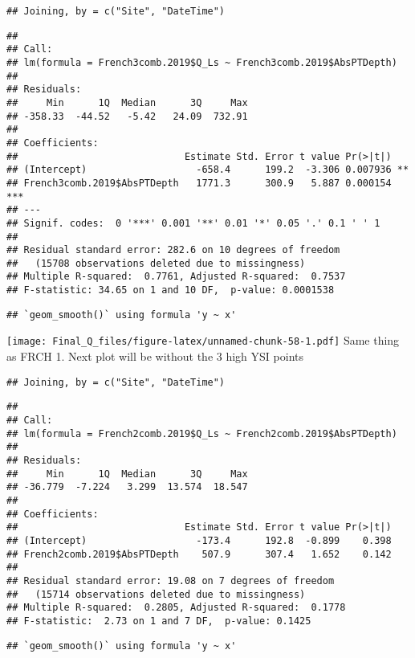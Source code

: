 \documentclass[
]{article}
\begin{document}
\begin{verbatim}
## Joining, by = c("Site", "DateTime")
\end{verbatim}

\begin{verbatim}
## 
## Call:
## lm(formula = French3comb.2019$Q_Ls ~ French3comb.2019$AbsPTDepth)
## 
## Residuals:
##     Min      1Q  Median      3Q     Max 
## -358.33  -44.52   -5.42   24.09  732.91 
## 
## Coefficients:
##                             Estimate Std. Error t value Pr(>|t|)    
## (Intercept)                   -658.4      199.2  -3.306 0.007936 ** 
## French3comb.2019$AbsPTDepth   1771.3      300.9   5.887 0.000154 ***
## ---
## Signif. codes:  0 '***' 0.001 '**' 0.01 '*' 0.05 '.' 0.1 ' ' 1
## 
## Residual standard error: 282.6 on 10 degrees of freedom
##   (15708 observations deleted due to missingness)
## Multiple R-squared:  0.7761, Adjusted R-squared:  0.7537 
## F-statistic: 34.65 on 1 and 10 DF,  p-value: 0.0001538
\end{verbatim}

\begin{verbatim}
## `geom_smooth()` using formula 'y ~ x'
\end{verbatim}

\texttt{[image: Final\_Q\_files/figure-latex/unnamed-chunk-58-1.pdf]} Same
thing as FRCH 1. Next plot will be without the 3 high YSI points

\begin{verbatim}
## Joining, by = c("Site", "DateTime")
\end{verbatim}

\begin{verbatim}
## 
## Call:
## lm(formula = French2comb.2019$Q_Ls ~ French2comb.2019$AbsPTDepth)
## 
## Residuals:
##     Min      1Q  Median      3Q     Max 
## -36.779  -7.224   3.299  13.574  18.547 
## 
## Coefficients:
##                             Estimate Std. Error t value Pr(>|t|)
## (Intercept)                   -173.4      192.8  -0.899    0.398
## French2comb.2019$AbsPTDepth    507.9      307.4   1.652    0.142
## 
## Residual standard error: 19.08 on 7 degrees of freedom
##   (15714 observations deleted due to missingness)
## Multiple R-squared:  0.2805, Adjusted R-squared:  0.1778 
## F-statistic:  2.73 on 1 and 7 DF,  p-value: 0.1425
\end{verbatim}

\begin{verbatim}
## `geom_smooth()` using formula 'y ~ x'
\end{verbatim}
\end{document}
